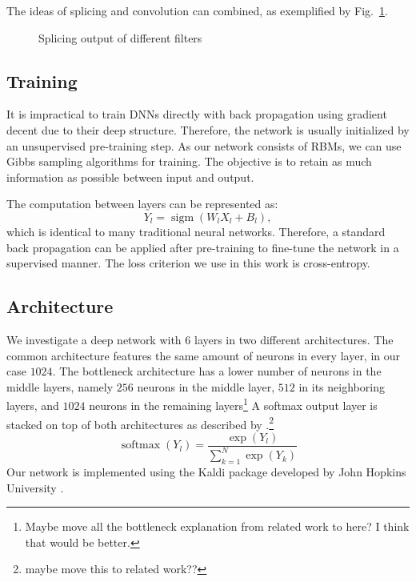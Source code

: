 \documentclass{article}
\DeclareMathOperator*{\sigm}{sigm}
\DeclareMathOperator*{\softmax}{softmax}
\begin{document}
The ideas of splicing and convolution can combined, as exemplified by Fig.~\ref{fig:filtersplice}.
\begin{figure}
 \centerline{}
 \caption{Splicing output of different filters}
 \label{fig:filtersplice}
\end{figure}
 
\subsection{Training}\label{sec:train}
It is impractical to train DNNs directly with back propagation using gradient decent due to their deep structure. Therefore, the network is usually initialized by an unsupervised pre-training step. As our network consists of RBMs, we can use Gibbs sampling algorithms for training. The objective is to retain as much information as possible between input and output. 

The computation between layers can be represented as:
\begin{equation}\label{dbn}
Y_{l} = \sigm(W_{l}X_{l} + B_{l}) ,
\end{equation}  
which is identical to many traditional neural networks. Therefore, a standard back propagation can be applied after pre-training to fine-tune the network in a supervised manner. The loss criterion we use in this work is cross-entropy.  

\subsection{Architecture}\label{sec:arch}
We investigate a deep network with $6$ layers in two different architectures. The common architecture features the same amount of neurons in every layer, in our case $1024$. The bottleneck architecture has a lower number of neurons in the middle layers, namely $256$ neurons in the middle layer, $512$ in its neighboring layers, and $1024$ neurons in the remaining layers\footnote{Maybe move all the bottleneck explanation from related work to here? I think that would be better.} 
A softmax output layer is stacked on top of both architectures as described by .\footnote{maybe move this to related work??}
\begin{equation}\label{softmax}
\softmax(Y_{l}) = \frac{\exp(Y_{l})}{\sum_{k=1}^N \exp(Y_{k})}
\end{equation}
Our network is implemented using the Kaldi package developed by John Hopkins University \cite{povey2011kaldi}.
 
\end{document}
